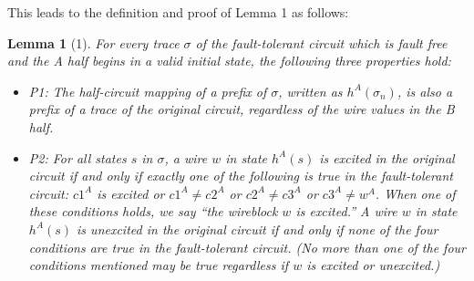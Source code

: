 \documentclass[12pt]{report}
\newtheorem*{lemma}{Lemma}
\begin{document}
This leads to the definition and proof of Lemma 1 as follows:

\begin{lemma}[1]
For every trace $\sigma$ of the fault-tolerant circuit which is fault free and the A half begins in a valid initial state, the following three properties hold: %
\begin{itemize}
\item P1: The half-circuit mapping of a prefix of $\sigma$, written as $h^{A}(\sigma_n)$, is also a prefix of a trace of the original circuit, regardless of the wire values in the B half.
\item P2: For all states $s$ in $\sigma$, a wire $w$ in state $h^A(s)$ is excited in the original circuit if and only if exactly one of the following is true in the fault-tolerant circuit: $c1^A$ is excited or $c1^{A}\neq c2^{A}$ or $c2^{A}\neq c3^A$ or $c3^{A}\neq w^A$.  When one of these conditions holds, we say “the wireblock $w$ is excited.”  A wire $w$ in state $h^A(s)$ is unexcited in the original circuit if and only if none of the four conditions are true in the fault-tolerant circuit.  (No more than one of the four conditions mentioned may be true regardless if $w$ is excited or unexcited.) 
\end{itemize}
 



\end{lemma}
\end{document}
